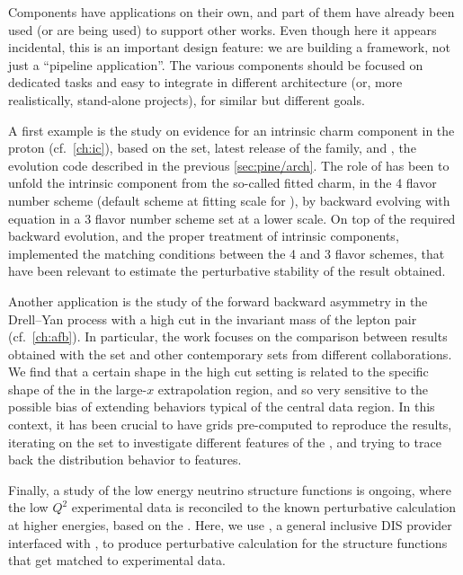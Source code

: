 
Components have applications on their own, and part of them have already been
used (or are being used) to support other works.
Even though here it appears incidental, this is an important design feature: we
are building a framework, not just a \enquote{pipeline application}.
The various components should be focused on dedicated tasks and easy to
integrate in different architecture (or, more realistically, stand-alone
projects), for similar but different goals.

A first example is the study on evidence
for an intrinsic charm component in the proton \cite{Ball:2022qks} (cf.\
\cref{ch:ic}), based on the  \pdf set, latest release of the \nnpdf
family, and \eko \cite{Candido:2022tld}, the evolution code described in the
previous \cref{sec:pine/arch}.
The role of \eko has been to unfold the intrinsic component from the so-called
fitted charm, in the 4 flavor number scheme (default scheme at fitting scale
for \nnpdf), by backward evolving with \dglap equation in a 3 flavor number
scheme \pdf set at a lower scale.
On top of the required backward evolution, and the proper treatment of
intrinsic components,
\eko implemented the \nnnlo matching conditions
between the 4 and 3 flavor schemes, that have been relevant to estimate the
perturbative stability of the result obtained.

Another application is the study of the forward backward asymmetry in the
Drell--Yan process with a high cut in the invariant mass of the
lepton pair \cite{Ball:2022qtp} (cf.\ \cref{ch:afb}).
In particular, the work focuses on the comparison between results obtained with
the \nnpdf 4.0 \pdf set and other contemporary ets from different
collaborations. We find that a certain shape in the high cut setting is related
to the specific shape of the \pdfs in the large-$x$ extrapolation region, and
so very sensitive to the possible bias of extending behaviors typical of the
central data region.
In this context, it has been crucial to have \pineappl \cite{Carrazza:2020gss}
\cite{christopher_schwan_2022_7145377} grids pre-computed to reproduce the
results, iterating on the \pdf set to investigate different features of the
\pdf, and trying to trace back the distribution behavior to \pdf features.

Finally, a study of the low energy neutrino structure functions is ongoing,
where the low $Q^2$ experimental data is reconciled to the known
perturbative calculation at higher energies, based on the \pdfs.
Here, we use \yadism, a general inclusive DIS provider
interfaced with \pineappl, to produce perturbative \qcd calculation for the
structure functions that get matched to experimental data.
